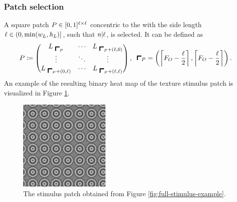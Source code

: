 \subsubsection{Patch selection}
\label{sec:patch-selection}

A square patch $P \in [0, 1]^{\ell \times \ell}$ concentric to the \stimfig{} with the side length $\ell \in (0, \min(w_L, h_L)]$,  such that $n | \ell$, is selected. It can be defined as
\begin{equation}
    \patchmatrix \coloneqq 
    \begin{pmatrix}
        \fullmatrix_{\ \patchstart} & \cdots  & \fullmatrix_{\ \patchstart + (\patchsize, 0)}  \\
        \vdots & \ddots & \vdots  \\
        \fullmatrix_{\ \patchstart + (0, \patchsize)} & \cdots  &  \fullmatrix_{\ \patchstart + (\patchsize, \patchsize)}
    \end{pmatrix}, \;\
    \patchstart = \left( \ceil{ \figcenter - \frac{\patchsize}{2}}, \ceil{  \figcenter - \frac{\patchsize}{2} } \right).
\end{equation}
An example of the resulting binary heat map of the texture stimulus patch is visualized in Figure \ref{fig:stim-patch-example}.

\begin{figure}
    \centering
    \includegraphics[width=0.4\textwidth]{src/assets/images/stimulus-patch.png}
    \caption[Stimulus patch]{The stimulus patch obtained from Figure \ref{fig:full-stimulus-example}.}
    \label{fig:stim-patch-example}
\end{figure}






